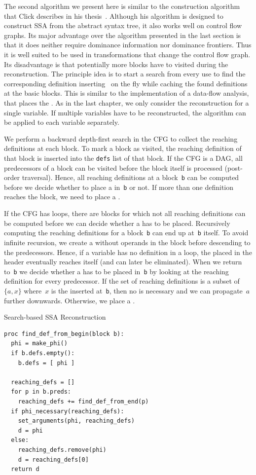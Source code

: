 The second algorithm we present here is similar to the construction algorithm that Click describes in his thesis~\cite{click:thesis}.
Although his algorithm is designed to construct SSA from the abstract syntax tree, it also works well on control flow graphs.
Its major advantage over the algorithm presented in the last section is that it does neither require dominance information nor dominance frontiers.
Thus it is well suited to be used in transformations that change the control flow graph.
Its disadvantage is that potentially more blocks have to visited during the reconstruction.
The principle idea is to start a search from every use to find the corresponding definition inserting \phiops\ on the fly while caching the found definitions at the basic blocks.
This is similar to the implementation of a data-flow analysis, that places the \phiops.
As in the last chapter, we only consider the reconstruction for a single variable.
If multiple variables have to be reconstructed, the algorithm can be applied to each variable separately.

We perform a backward depth-first search in the CFG to collect the reaching definitions at each block. 
To mark a block as visited, the reaching definition of that block is inserted into the \verb|defs| list of that block.
If the CFG is a DAG, all predecessors of a block can be visited before the block itself is processed (post-order traversal).
Hence, all reaching definitions at a block~\verb|b| can be computed before we decide whether to place a \phiop{} in~\verb|b| or not.
If more than one definition reaches the block, we need to place a \phiop.

If the CFG has loops, there are blocks for which not all reaching definitions can be computed before we can decide whether a \phiop{} has to be placed.
Recursively computing the reaching definitions for a block~\verb|b| can end up at~\verb|b| itself.
To avoid infinite recursion, we create a \phiop{} without operands in the block before descending to the predecessors. 
Hence, if a variable has no definition in a loop, the \phiop{} placed in the header eventually reaches itself (and can later be eliminated). 
When we return to~\verb|b| we decide whether a \phiop{} has to be placed in~\verb|b| by looking at the reaching definition for every predecessor.
If the set of reaching definitions is a subset of $\{a,x\}$ where~$x$ is the \phiop{} inserted at~\verb|b|, then no \phiop{} is necessary and we can propagate~$a$ further downwards. 
Otherwise, we place a \phiop.

\begin{algorithm}
	\caption{Search-based SSA Reconstruction}
	\label{alg:ssaconstr_click}

\begin{verbatim}
proc find_def_from_begin(block b):
  phi = make_phi()
  if b.defs.empty():
    b.defs = [ phi ] 

  reaching_defs = []
  for p in b.preds:
    reaching_defs += find_def_from_end(p)
  if phi_necessary(reaching_defs):
    set_arguments(phi, reaching_defs)
    d = phi
  else:
    reaching_defs.remove(phi)
    d = reaching_defs[0]
  return d
\end{verbatim}
\end{algorithm}

